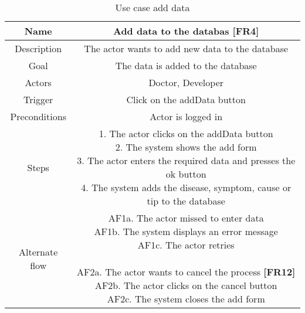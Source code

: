 \begin{table}[H]
	\begin{center}\scriptsize
		\begin{tabular}{ c|c } 
			\hline	
			Name & Add data to the databas  \textbf{[FR4]} \\
			\hline
			Description & The actor wants to add new data to the database \\ 
			\hline
			Goal & The data is added to the database \\ 
			\hline
			Actors & Doctor, Developer \\ 
			\hline
			Trigger & Click on the addData button \\ 
			\hline
			Preconditions & Actor is logged in \\ 
			\hline
			Steps & \parbox{9cm}{\vspace{.5\baselineskip}
				1. The actor clicks on the addData button\\
				2. The system shows the add form\\
				3. The actor enters the required data and presses the ok button\\
				4. The system adds the disease, symptom, cause or tip to the database\\ } \\
			\hline
			Alternate flow & \parbox{9cm}{\vspace{.5\baselineskip}
				AF1a. The actor missed to enter data\\
				AF1b. The system displays an error message\\
				AF1c. The actor retries\\\\
				AF2a. The actor wants to cancel the process \textbf{[FR12]}\\
				AF2b. The actor clicks on the cancel button\\
				AF2c. The system closes the add form}\\ 
			\hline
		\end{tabular}
	\end{center}\normalsize
	\caption{Use case add data}
\end{table}
